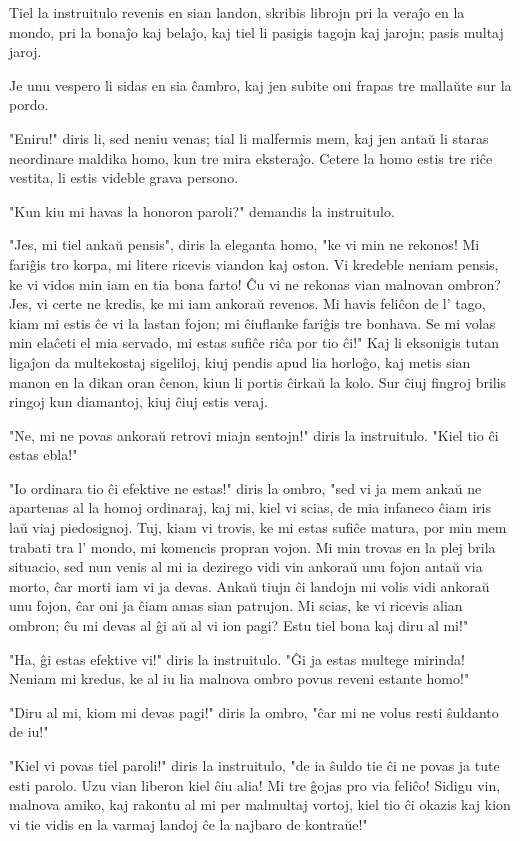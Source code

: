 \documentclass[ngerman,12pt,twoside]{book}
\begin{document}
Tiel la instruitulo revenis en sian landon, skribis librojn pri la veraĵo en la mondo, pri la bonaĵo kaj belaĵo, kaj tiel li pasigis tagojn kaj jarojn; pasis multaj jaroj.

Je unu vespero li sidas en sia ĉambro, kaj jen subite oni frapas tre mallaŭte sur la pordo.

"Eniru!" diris li, sed neniu venas; tial li malfermis mem, kaj jen antaŭ li staras neordinare maldika homo, kun tre mira eksteraĵo. Cetere la homo estis tre riĉe vestita, li estis videble grava persono.

"Kun kiu mi havas la honoron paroli?" demandis la instruitulo.

"Jes, mi tiel ankaŭ pensis", diris la eleganta homo, "ke vi min ne rekonos! Mi fariĝis tro korpa, mi litere ricevis viandon kaj oston. Vi kredeble neniam pensis, ke vi vidos min iam en tia bona farto! Ĉu vi ne rekonas vian malnovan ombron? Jes, vi certe ne kredis, ke mi iam ankoraŭ revenos. Mi havis feliĉon de l' tago, kiam mi estis ĉe vi la lastan fojon; mi ĉiuflanke fariĝis tre bonhava. Se mi volas min elaĉeti el mia servado, mi estas sufiĉe riĉa por tio ĉi!" Kaj li eksonigis tutan ligaĵon da multekostaj sigeliloj, kiuj pendis apud lia horloĝo, kaj metis sian manon en la dikan oran ĉenon, kiun li portis ĉirkaŭ la kolo. Sur ĉiuj fingroj brilis ringoj kun diamantoj, kiuj ĉiuj estis veraj.

"Ne, mi ne povas ankoraŭ retrovi miajn sentojn!" diris la instruitulo. "Kiel tio ĉi estas ebla!"

"Io ordinara tio ĉi efektive ne estas!" diris la ombro, "sed vi ja mem ankaŭ ne apartenas al la homoj ordinaraj, kaj mi, kiel vi scias, de mia infaneco ĉiam iris laŭ viaj piedosignoj. Tuj, kiam vi trovis, ke mi estas sufiĉe matura, por min mem trabati tra l' mondo, mi komencis propran vojon. Mi min trovas en la plej brila situacio, sed nun venis al mi ia dezirego vidi vin ankoraŭ unu fojon antaŭ via morto, ĉar morti iam vi ja devas. Ankaŭ tiujn ĉi landojn mi volis vidi ankoraŭ unu fojon, ĉar oni ja ĉiam amas sian patrujon. Mi scias, ke vi ricevis alian ombron; ĉu mi devas al ĝi aŭ al vi ion pagi? Estu tiel bona kaj diru al mi!"

"Ha, ĝi estas efektive vi!" diris la instruitulo. "Ĝi ja estas multege mirinda! Neniam mi kredus, ke al iu lia malnova ombro povus reveni estante homo!"

"Diru al mi, kiom mi devas pagi!" diris la ombro, "ĉar mi ne volus resti ŝuldanto de iu!"

"Kiel vi povas tiel paroli!" diris la instruitulo, "de ia ŝuldo tie ĉi ne povas ja tute esti parolo. Uzu vian liberon kiel ĉiu alia! Mi tre ĝojas pro via feliĉo! Sidigu vin, malnova amiko, kaj rakontu al mi per malmultaj vortoj, kiel tio ĉi okazis kaj kion vi tie vidis en la varmaj landoj ĉe la najbaro de kontraŭe!"
\end{document}
